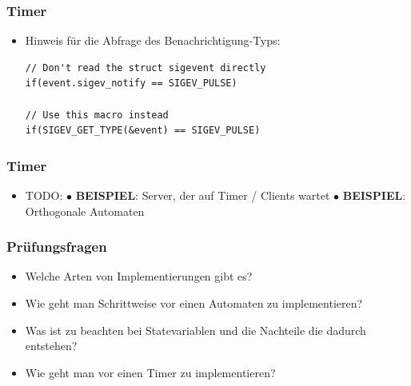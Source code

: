 \documentclass{beamer}
\begin{document}
\begin{frame}[fragile]
 \frametitle{Timer}
 \begin{itemize}
  \item Hinweis f\"ur die Abfrage des Benachrichtigung-Typs:\newline
  \begin{lstlisting}
// Don't read the struct sigevent directly
if(event.sigev_notify == SIGEV_PULSE)

// Use this macro instead
if(SIGEV_GET_TYPE(&event) == SIGEV_PULSE)
  \end{lstlisting}
 \end{itemize}
\end{frame}

\begin{frame}[fragile]
 \frametitle{Timer}
 \begin{itemize}
  \item TODO:\newline\newline
  $\bullet$ \textbf{BEISPIEL}: Server, der auf Timer / Clients wartet\newline\newline
  $\bullet$ \textbf{BEISPIEL}: Orthogonale Automaten\newline\newline
 \end{itemize}
\end{frame}

\begin{frame}
 \frametitle{Pr\"ufungsfragen}
 \begin{itemize}
  \item Welche Arten von Implementierungen gibt es?
  \item Wie geht man Schrittweise vor einen Automaten zu implementieren?
  \item Was ist zu beachten bei Statevariablen und die Nachteile die dadurch entstehen?
  \item Wie geht man vor einen Timer zu implementieren?
 \end{itemize}
\end{frame}
\end{document}
